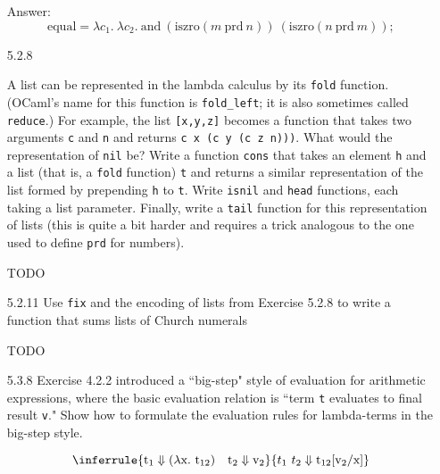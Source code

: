 \documentclass[12pt]{article}
\newcommand{\mt}[1]{\ensuremath{\text{#1}}}
\newcommand{\abstr}[1]{\lambda #1.\ }
\begin{document}
\begin{enumerate}
Answer:
$$
\mt{equal} = \abstr{c_1}\abstr{c_2} \mt{and} \ (\mt{iszro} (m \ \mt{prd} \ n)) \ (\mt{iszro} (n \ \mt{prd} \ m));
$$

\item[5.2.8]

A list can be represented in the lambda calculus by its \texttt{fold} function. (OCaml's name for this function is \texttt{fold\_left}; it is also sometimes called \texttt{reduce}.) For example, the list \texttt{[x,y,z]} becomes a function that takes two arguments \texttt{c} and \texttt{n} and returns \texttt{c x (c y (c z n)))}. What would the representation of \texttt{nil} be? Write a function \texttt{cons} that takes an element \texttt{h} and a list (that is, a \texttt{fold} function) \texttt{t} and returns a similar representation of the list formed by prepending \texttt{h} to \texttt{t}. Write \texttt{isnil} and \texttt{head} functions, each taking a list parameter. Finally, write a \texttt{tail} function for this representation of lists (this is quite a bit harder and requires a trick analogous to the one used to define \texttt{prd} for numbers).

TODO

\item[5.2.11] Use \texttt{fix} and the encoding of lists from Exercise 5.2.8 to write a function that sums lists of Church numerals

TODO

\item[5.3.8] Exercise 4.2.2 introduced a ``big-step" style of evaluation for
arithmetic expressions, where the basic evaluation relation is ``term \texttt{t} evaluates to final result \texttt{v}." Show how to formulate the evaluation rules for lambda-terms in the big-step style.

$$
\inferrule{
  \mt{t}_1 \Downarrow (\abstr{\mt{x}} \mt{t}_{12}) \quad \mt{t}_2 \Downarrow \mt{v}_2
}{ t_1 \ t_2 \Downarrow \mt{t}_{12}[\mt{v}_2/\mt{x}]
}
$$

\end{enumerate}

\newpage
\end{document}
